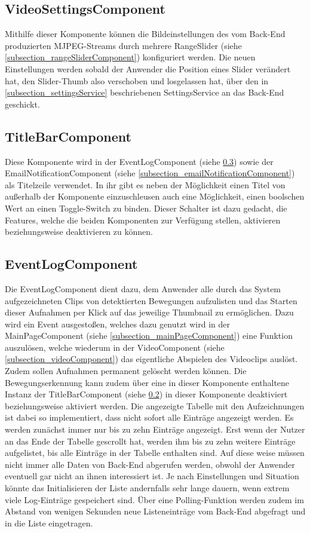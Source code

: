 \subsection{VideoSettingsComponent}
Mithilfe dieser Komponente können die Bildeinstellungen des vom Back-End produzierten \acs{MJPEG}-Streams durch mehrere RangeSlider (siehe \ref{subsection_rangeSliderComponent}) konfiguriert werden. Die neuen Einstellungen werden sobald der Anwender die Position eines Slider verändert hat, den Slider-Thumb also verschoben und losgelassen hat, über den in \ref{subsection_settingsService} beschriebenen SettingsService an das Back-End geschickt.

\subsection{TitleBarComponent}
\label{subsection_titleBarComponent}
Diese Komponente wird in der EventLogComponent (siehe \ref{subsection_eventLogComponent}) sowie der EmailNotificationComponent (siehe \ref{subsection_emailNotificationComponent}) als Titelzeile verwendet. In ihr gibt es neben der Möglichkeit einen Titel von außerhalb der Komponente einzuschleusen auch eine Möglichkeit, einen boolschen Wert an einen Toggle-Switch zu binden. Dieser Schalter ist dazu gedacht, die Features, welche die beiden Komponenten zur Verfügung stellen, aktivieren beziehungsweise deaktivieren zu können.

\subsection{EventLogComponent}
\label{subsection_eventLogComponent}
Die EventLogComponent dient dazu, dem Anwender alle durch das System aufgezeichneten Clips von detektierten Bewegungen aufzulisten und das Starten dieser Aufnahmen per Klick auf das jeweilige Thumbnail zu ermöglichen. Dazu wird ein Event ausgestoßen, welches dazu genutzt wird in der MainPageComponent (siehe \ref{subsection_mainPageComponent}) eine Funktion auszulösen, welche wiederum in der VideoComponent (siehe \ref{subsection_videoComponent}) das eigentliche Abspielen des Videoclips auslöst. Zudem sollen Aufnahmen permanent gelöscht werden können. Die Bewegungserkennung kann zudem über eine in dieser Komponente enthaltene Instanz der TitleBarComponent (siehe \ref{subsection_titleBarComponent}) in dieser Komponente deaktiviert beziehungsweise aktiviert werden. Die angezeigte Tabelle mit den Aufzeichnungen ist dabei so implementiert, dass nicht sofort alle Einträge angezeigt werden. Es werden zunächst immer nur bis zu zehn Einträge angezeigt. Erst wenn der Nutzer an das Ende der Tabelle gescrollt hat, werden ihm bis zu zehn weitere Einträge aufgelistet, bis alle Einträge in der Tabelle enthalten sind. Auf diese weise müssen nicht immer alle Daten von Back-End abgerufen werden, obwohl der Anwender eventuell gar nicht an ihnen interessiert ist. Je nach Einstellungen und Situation könnte das Initialisieren der Liste andernfalls sehr lange dauern, wenn extrem viele Log-Einträge gespeichert sind. Über eine Polling-Funktion werden zudem im Abstand von wenigen Sekunden neue Listeneinträge vom Back-End abgefragt und in die Liste eingetragen.

